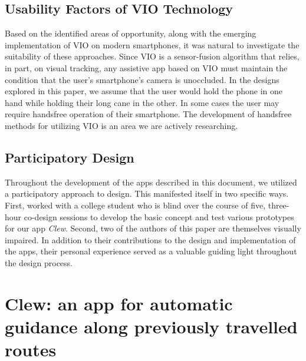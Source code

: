 \documentclass[chi_draft]{sigchi}
\begin{document}
\subsection{Usability Factors of VIO Technology}
Based on the identified areas of opportunity, along with the emerging implementation of VIO on modern smartphones, it was natural to investigate the suitability of these approaches.  Since VIO is a sensor-fusion algorithm that relies, in part, on visual tracking, any assistive app based on VIO must maintain the condition that the user's smartphone's camera is unoccluded.  In the designs explored in this paper, we assume that the user would hold the phone in one hand while holding their long cane in the other.  In some cases the user may require handsfree operation of their smartphone. The development of handsfree methods for utilizing VIO is an area we are actively researching.

\subsection{Participatory Design}
Throughout the development of the apps described in this document, we utilized a participatory approach to design.  This manifested itself in two specific ways.  First, worked with a college student who is blind over the course of five, three-hour co-design sessions to develop the basic concept and test various prototypes for our app \emph{Clew}.   Second, two of the authors of this paper are themselves visually impaired.  In addition to their contributions to the design and implementation of the apps, their personal experience served as a valuable guiding light throughout the design process.

\section{Clew: an app for automatic guidance along previously travelled routes}
\end{document}
